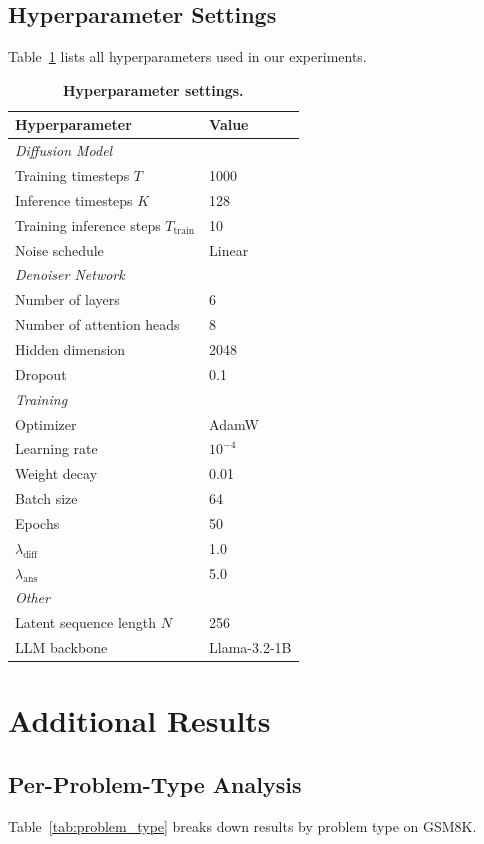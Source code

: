 \documentclass{article}
\begin{document}
\subsection{Hyperparameter Settings}
Table~\ref{tab:hyperparams} lists all hyperparameters used in our experiments.

\begin{table}[h]
\centering
\caption{\textbf{Hyperparameter settings.}}
\label{tab:hyperparams}
\begin{tabular}{ll}
\toprule
\textbf{Hyperparameter} & \textbf{Value} \\
\midrule
\multicolumn{2}{l}{\textit{Diffusion Model}} \\
Training timesteps $T$ & 1000 \\
Inference timesteps $K$ & 128 \\
Training inference steps $T_\text{train}$ & 10 \\
Noise schedule & Linear \\
\midrule
\multicolumn{2}{l}{\textit{Denoiser Network}} \\
Number of layers & 6 \\
Number of attention heads & 8 \\
Hidden dimension & 2048 \\
Dropout & 0.1 \\
\midrule
\multicolumn{2}{l}{\textit{Training}} \\
Optimizer & AdamW \\
Learning rate & $10^{-4}$ \\
Weight decay & 0.01 \\
Batch size & 64 \\
Epochs & 50 \\
$\lambda_\text{diff}$ & 1.0 \\
$\lambda_\text{ans}$ & 5.0 \\
\midrule
\multicolumn{2}{l}{\textit{Other}} \\
Latent sequence length $N$ & 256 \\
LLM backbone & Llama-3.2-1B \\
\bottomrule
\end{tabular}
\end{table}

\section{Additional Results}
\label{app:results}

\subsection{Per-Problem-Type Analysis}
Table~\ref{tab:problem_type} breaks down results by problem type on GSM8K.
\end{document}
